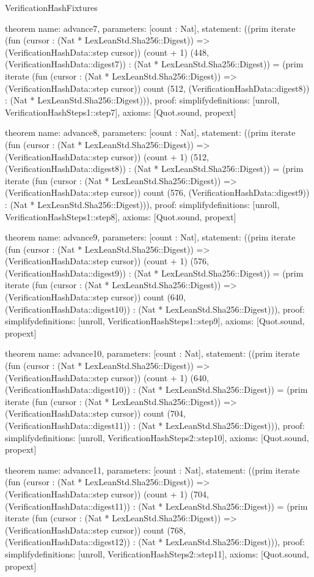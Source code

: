 \begin{lexlean}{VerificationHashFixtures}
\begin{semanticmodule}
theorem{
  name: advance7,
  parameters: [count : Nat],
  statement: ((prim iterate (fun (cursor : (Nat * LexLeanStd.Sha256::Digest)) => (VerificationHashData::step cursor)) (count + 1) (448, (VerificationHashData::digest7)) : (Nat * LexLeanStd.Sha256::Digest)) = (prim iterate (fun (cursor : (Nat * LexLeanStd.Sha256::Digest)) => (VerificationHashData::step cursor)) count (512, (VerificationHashData::digest8)) : (Nat * LexLeanStd.Sha256::Digest))),
  proof: simplify{definitions: [unroll, VerificationHashSteps1::step7]},
  axioms: [Quot.sound, propext]
}

theorem{
  name: advance8,
  parameters: [count : Nat],
  statement: ((prim iterate (fun (cursor : (Nat * LexLeanStd.Sha256::Digest)) => (VerificationHashData::step cursor)) (count + 1) (512, (VerificationHashData::digest8)) : (Nat * LexLeanStd.Sha256::Digest)) = (prim iterate (fun (cursor : (Nat * LexLeanStd.Sha256::Digest)) => (VerificationHashData::step cursor)) count (576, (VerificationHashData::digest9)) : (Nat * LexLeanStd.Sha256::Digest))),
  proof: simplify{definitions: [unroll, VerificationHashSteps1::step8]},
  axioms: [Quot.sound, propext]
}

theorem{
  name: advance9,
  parameters: [count : Nat],
  statement: ((prim iterate (fun (cursor : (Nat * LexLeanStd.Sha256::Digest)) => (VerificationHashData::step cursor)) (count + 1) (576, (VerificationHashData::digest9)) : (Nat * LexLeanStd.Sha256::Digest)) = (prim iterate (fun (cursor : (Nat * LexLeanStd.Sha256::Digest)) => (VerificationHashData::step cursor)) count (640, (VerificationHashData::digest10)) : (Nat * LexLeanStd.Sha256::Digest))),
  proof: simplify{definitions: [unroll, VerificationHashSteps1::step9]},
  axioms: [Quot.sound, propext]
}

theorem{
  name: advance10,
  parameters: [count : Nat],
  statement: ((prim iterate (fun (cursor : (Nat * LexLeanStd.Sha256::Digest)) => (VerificationHashData::step cursor)) (count + 1) (640, (VerificationHashData::digest10)) : (Nat * LexLeanStd.Sha256::Digest)) = (prim iterate (fun (cursor : (Nat * LexLeanStd.Sha256::Digest)) => (VerificationHashData::step cursor)) count (704, (VerificationHashData::digest11)) : (Nat * LexLeanStd.Sha256::Digest))),
  proof: simplify{definitions: [unroll, VerificationHashSteps2::step10]},
  axioms: [Quot.sound, propext]
}

theorem{
  name: advance11,
  parameters: [count : Nat],
  statement: ((prim iterate (fun (cursor : (Nat * LexLeanStd.Sha256::Digest)) => (VerificationHashData::step cursor)) (count + 1) (704, (VerificationHashData::digest11)) : (Nat * LexLeanStd.Sha256::Digest)) = (prim iterate (fun (cursor : (Nat * LexLeanStd.Sha256::Digest)) => (VerificationHashData::step cursor)) count (768, (VerificationHashData::digest12)) : (Nat * LexLeanStd.Sha256::Digest))),
  proof: simplify{definitions: [unroll, VerificationHashSteps2::step11]},
  axioms: [Quot.sound, propext]
}


\end{semanticmodule}
\end{lexlean}
